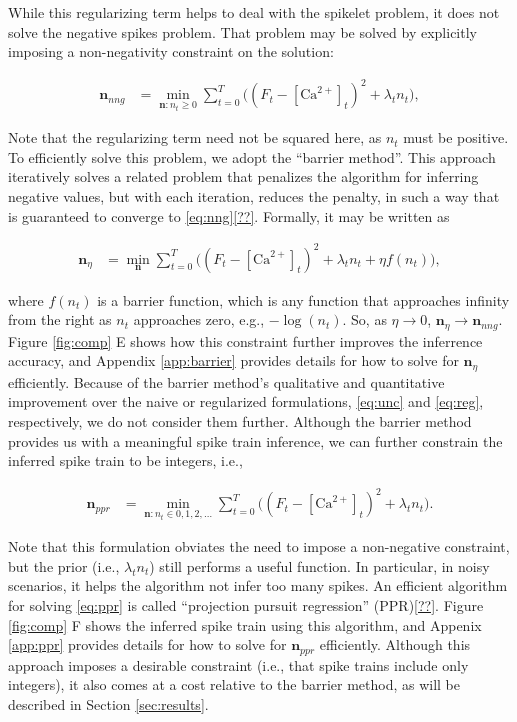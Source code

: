 \documentclass[12pt]{article}
\providecommand{\ve}[1]{\boldsymbol{#1}}
\providecommand{\ve}[1]{\boldsymbol{#1}}
\newcommand{\Ca}{[\text{Ca}^{2+}]}
\begin{document}
While this regularizing term helps to deal with the spikelet problem, it does not solve the negative spikes problem. That problem may be solved by explicitly imposing a non-negativity constraint on the solution:

\begin{align} \label{eq:nng}
\ve{n}_{nng} &= \min_{\ve{n}: n_t \geq 0} \sum_{t=0}^T \big((F_t - \Ca_t)^2 +  \lambda_t n_t\big),
\end{align}

\noindent Note that the regularizing term need not be squared here, as $n_t$ must be positive. To efficiently solve this problem, we adopt the ``barrier method''.  This approach iteratively solves a related problem that penalizes the algorithm for inferring negative values, but with each iteration, reduces the penalty, in such a way that is guaranteed to converge to \eqref{eq:nng}\ref{??}.  Formally, it may be written as

\begin{align} \label{eq:b}
\ve{n}_{\eta} &= \min_{\ve{n}} \sum_{t=0}^T \big((F_t - \Ca_t)^2  + \lambda_t n_t + \eta f(n_t)\big),
\end{align}

\noindent where $f(n_t)$ is a barrier function, which is any function that approaches infinity from the right as $n_t$ approaches zero, e.g., $-\log(n_t)$.  So, as $\eta \rightarrow 0$, $\ve{n}_{\eta} \rightarrow \ve{n}_{nng}$. Figure \ref{fig:comp} E shows how this constraint further improves the inferrence accuracy, and Appendix \ref{app:barrier} provides details for how to solve for $\ve{n}_{\eta}$ efficiently. Because of the barrier method's qualitative and quantitative improvement over the naive or regularized formulations, \eqref{eq:unc} and \eqref{eq:reg}, respectively, we do not consider them further.  Although the barrier method provides us with a meaningful spike train inference, we can further constrain the inferred spike train to be integers, i.e.,

\begin{align} \label{eq:ppr}
\ve{n}_{ppr} &= \min_{\ve{n}: n_t \in 0,1,2,\ldots} \sum_{t=0}^T \big((F_t - \Ca_t)^2  + \lambda_t n_t\big).
\end{align}

\noindent Note that this formulation obviates the need to impose a non-negative constraint, but the prior (i.e., $\lambda_t n_t$) still performs a useful function.  In particular, in noisy scenarios, it helps the algorithm not infer too many spikes.  An efficient algorithm for solving \eqref{eq:ppr} is called ``projection pursuit regression'' (PPR)\ref{??}.  Figure \ref{fig:comp} F shows the inferred spike train using this algorithm, and Appenix \ref{app:ppr} provides details for how to solve for $\ve{n}_{ppr}$ efficiently. Although this approach imposes a desirable constraint (i.e., that spike trains include only integers), it also comes at a cost relative to the barrier method, as will be described in Section \ref{sec:results}.
\end{document}
